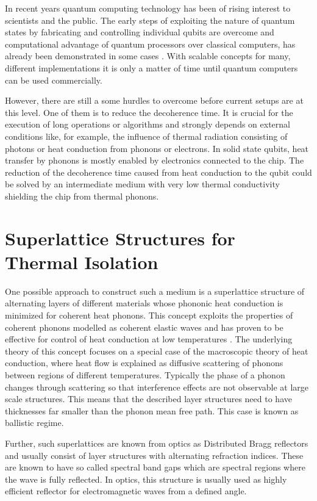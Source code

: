 In recent years quantum computing technology has been of rising
interest to scientists and the public. The early steps of exploiting the nature
of quantum states by fabricating and controlling individual qubits  are
overcome \cite{Leonard2019,Crippa2019} and computational advantage of quantum
processors
over
classical computers, has already been demonstrated in some cases
\cite{Arute2019}. With scalable concepts for many,
different implementations \cite{Cirac2000, Brecht2016, Bluhm2019, Lao2018}
it is only a matter of time until quantum computers can be used
commercially.

However, there are still a some hurdles to overcome before current setups are
at this level. One of them is to reduce the decoherence time. It is crucial for
the execution of long operations or algorithms and strongly
depends on external conditions like, for example, the influence of thermal
radiation consisting of photons or heat conduction from phonons or
electrons\cite{Ferraro2019}.
In solid state qubits, heat transfer by phonons is mostly
enabled by electronics connected to the chip.
The reduction of the decoherence time caused from heat conduction to the qubit
could be solved by an intermediate medium with very low thermal
conductivity shielding the chip from thermal phonons.

\section{Superlattice Structures for Thermal Isolation}
One possible approach to
construct such a medium is a superlattice structure of alternating layers of
different materials whose phononic heat conduction is minimized for coherent
heat phonons. This concept exploits
the properties of coherent phonons modelled as coherent elastic waves and has
proven to be effective for control of heat conduction at low temperatures
\cite{Luckyanova2012}. The underlying theory of this concept focuses on a
special case of the macroscopic theory of heat conduction, where heat flow is
explained as diffusive scattering of phonons between regions of different
temperatures.
Typically the phase of a phonon changes through scattering so that interference
effects are not observable at large scale structures. This means that the
described layer structures need to have thicknesses far smaller than
the phonon mean free path. This case is known as ballistic regime.

Further, such superlattices are known from optics as Distributed Bragg
reflectors and usually consist of layer structures with alternating refraction
indices. These are known to have so called spectral band gaps which are
spectral regions where the wave is fully reflected.
In optics, this structure is usually used as highly efficient reflector for
electromagnetic waves from a defined angle.

